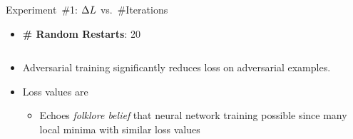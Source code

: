 \begin{frame}{Experiment~\#1: $\Delta L$ vs.\ \#Iterations}
  \begin{itemize}[<+->]
    \item \textbf{\# Random Restarts}: 20
  \end{itemize}

  \begin{columns}
    \begin{column}{0.23\textwidth}
      \begin{center}
      \end{center}
    \end{column}
    \begin{column}{0.2\textwidth}
      \begin{center}
      \end{center}
    \end{column}
    \begin{column}{0.21\textwidth}
      \begin{center}
      \end{center}
    \end{column}
    \begin{column}{0.22\textwidth}
      \begin{center}
      \end{center}
    \end{column}
  \end{columns}
  \vfill
  \begin{itemize}[<+->]
    \item Adversarial training significantly reduces loss on adversarial examples.
    \item Loss values are \textbf{}
      \begin{itemize}
        \item Echoes \textit{folklore belief} that neural network training possible since many local minima with similar loss values
      \end{itemize}
  \end{itemize}
\end{frame}


